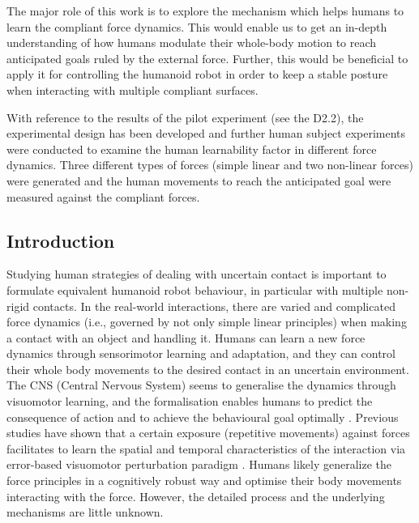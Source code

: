 

\newcommand{\BF}{\mathbf{F}}
\newcommand{\BZ}{\mathbf{Z}}
\newcommand{\BA}{\mathbf{A}}
\newcommand{\BB}{\mathbf{B}}
\newcommand{\BC}{\mathbf{C}}
\newcommand{\BD}{\mathbf{D}}

The major role of this work is to explore the mechanism which helps humans to learn the compliant force dynamics. This would enable us to get an in-depth understanding of how humans modulate their whole-body motion to reach anticipated goals ruled by the external force. Further, this would be beneficial to apply it for controlling the humanoid robot in order to keep a stable posture when interacting with multiple compliant surfaces. 

With reference to the results of the pilot experiment (see the D2.2), the experimental design has been developed and further human subject experiments were conducted to examine the human learnability factor in different force dynamics. Three different types of forces (simple linear and two non-linear forces) were generated and the human movements to reach the anticipated goal were measured against the compliant forces.
\subsection{Introduction}

Studying human strategies of dealing with uncertain contact is important to formulate equivalent humanoid robot behaviour, in particular with multiple non-rigid contacts. In the real-world interactions, there are varied and complicated force dynamics (i.e., governed by not only simple linear principles) when making a contact with an object and handling it. Humans can learn a new force dynamics through sensorimotor learning and adaptation, and they can control their whole body movements to the desired contact in an uncertain environment. The CNS (Central Nervous System) seems to generalise the dynamics through visuomotor learning, and the formalisation enables humans to predict the consequence of action and to achieve the behavioural goal optimally \cite{Wolpert2011, Davidson2003}. Previous studies have shown that a certain exposure (repetitive movements) against forces facilitates to learn the spatial and temporal characteristics of the interaction via error-based visuomotor perturbation paradigm \cite{Goodbody1998, Krakuer2006}. Humans likely generalize the force principles in a cognitively robust way and optimise their body movements interacting with the force. However, the detailed process and the underlying mechanisms are little unknown.

